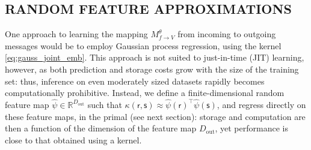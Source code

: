 \documentclass[english]{article}
\theoremstyle{plain}
\theoremstyle{plain}
\newcommand{\factor}{f}				%
\newcommand{\outV}{V}                         %
\newcommand{\approxMsg}[3]{M_{#1 \rightarrow #2}^{#3}}			%
\begin{document}




\subsection{RANDOM FEATURE APPROXIMATIONS}
\label{sec:randomFeatureApproximations}

One approach to learning the mapping  $\approxMsg{\factor}{\outV}{\theta}$ from incoming to outgoing messages
would be to employ Gaussian process regression, using the kernel \eqref{eq:gauss_joint_emb}.
This approach is not suited to just-in-time (JIT) learning, however,
as both prediction and storage costs grow with the size of the training set:
thus, inference on even moderately sized datasets rapidly becomes computationally prohibitive.
Instead, we define 
a finite-dimensional random feature map $\hat{\psi} \in \mathbb{R}^{D_\mathrm{out}}$ such that 
$\kappa(\mathsf{r}, \mathsf{s}) \approx \hat{\psi}(\mathsf{r})^\top \hat{\psi}(\mathsf{s})$, 
and regress directly on these feature maps, in the primal (see next section): storage and computation 
are then a function of the dimension of the feature map $D_\mathrm{out}$, yet performance is close to that
obtained using a kernel.
\end{document}
